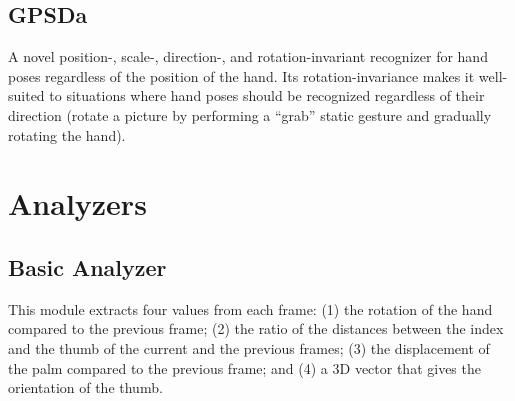 \subsection{GPSDa}
A novel position-, scale-, direction-, and rotation-invariant recognizer for hand poses regardless of the position of the hand. Its rotation-invariance makes it well-suited to situations where hand poses should be recognized regardless of their direction (\eg rotate a picture by performing a ``grab'' static gesture and gradually rotating the hand). %

\section{Analyzers} \label{app:quantumleap-modules:analyzers}
\subsection{Basic Analyzer}
This module extracts four values from each frame: (1) the rotation of the hand compared to the previous frame; (2) the ratio of the distances between the index and the thumb of the current and the previous frames; (3) the displacement of the palm compared to the previous frame; and (4) a 3D vector that gives the orientation of the thumb.

